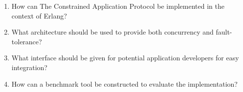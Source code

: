 \begin{enumerate}

\item How can The Constrained Application Protocol be implemented in the context of Erlang? 
\item What architecture should be used to provide both concurrency and fault-tolerance? 
\item What interface should be given for potential application developers for easy integration? 
\item How can a benchmark tool be constructed to evaluate the implementation? 

\end{enumerate}

